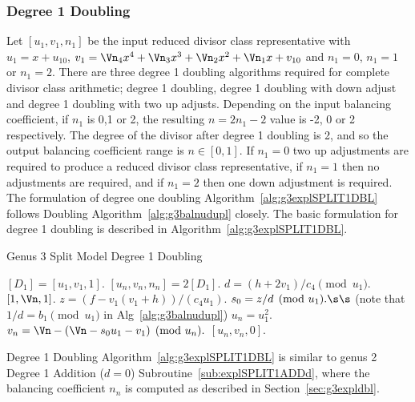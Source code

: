 \subsubsection{Degree 1 Doubling}
Let $[u_1,v_1,n_1]$ be the input reduced divisor class representative with $u_1 = x +
u_{10}$, $v_1 = \Vn_4x^4 + \Vn_3x^3 + \Vn_2x^2 + \Vn_1x + v_{10}$ and $n_1 = 0$,
$n_1 = 1$ or $n_1 = 2$.  There are three degree 1 doubling algorithms required
for complete divisor class arithmetic; degree 1 doubling, degree 1 doubling with
down adjust and degree 1 doubling with two up adjusts. Depending on the input
balancing coefficient, if $n_1$ is 0,1 or 2, the resulting $n = 2n_1 - 2$ value
is -2, 0 or 2 respectively. The degree of the divisor after degree 1 doubling is
2, and so the output balancing coefficient range is $n \in [0,1]$. If $n_1 = 0$
two up adjustments are required to produce a reduced divisor class
representative, if $n_1 = 1$ then no adjustments are required, and if $n_1 = 2$
then one down adjustment is required. The formulation of degree one doubling
Algorithm~\ref{alg:g3explSPLIT1DBL} follows Doubling
Algorithm~\ref{alg:g3balnudupl} closely. The basic formulation for degree 1
doubling is described in Algorithm~\ref{alg:g3explSPLIT1DBL}. \vspace{10pt}
\begin{algorithm}[htbp]
\caption{Genus 3 Split Model Degree 1 Doubling\label{alg:g3explSPLIT1DBL}}
\begin{algorithmic} [1]
\Require $[D_1] = [u_1,v_1,1]$.  \smallskip
\Ensure $[u_n,v_n,n_n] = 2[D_1]$.
\algrule
\State $d = (h + 2v_1)/c_4 \pmod{u_1}$.
 \Return $[1,\Vn,1]$.
\EndIf
\State $z = (f - v_1(v_1 + h))/(c_4u_1)$.
\State $s_0 = z/d \pmod{u_1}. \s\s$ (note that $1/d = b_1 \pmod{u_1}$ in Alg~\ref{alg:g3balnudupl})
\State $u_n = u_1^2$.
\State $v_n = \Vn - (\Vn -s_0u_1 - v_1)  \pmod{u_n}.$
\State \Return $[u_n,v_n,0]$.
\end{algorithmic}
\end{algorithm}
Degree 1 Doubling Algorithm~\ref{alg:g3explSPLIT1DBL} is similar to 
genus 2 Degree 1 Addition ($d=0$) Subroutine~\ref{sub:explSPLIT1ADDd}, where the
balancing coefficient $n_n$ is computed as described in
Section~\ref{sec:g3expldbl}. 

